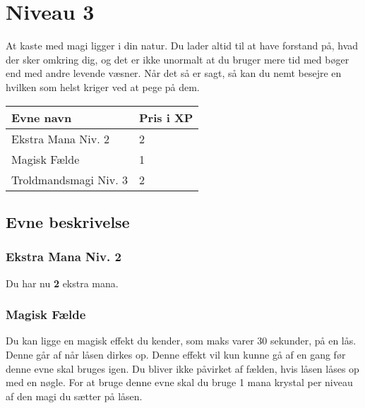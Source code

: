 \chapter*{Niveau 3}
At kaste med magi ligger i din natur. Du lader altid til at have forstand på, hvad der sker omkring dig, og det er ikke unormalt at du bruger mere tid med bøger end med andre levende væsner. Når det så er sagt, så kan du nemt besejre en hvilken som helst kriger ved at pege på dem.

\begin{table}[H]
    \centering
    \begin{tabular}{|p{}|p{}|}
    \rowcolor{cerulean!80}\hline
        Evne navn & Pris i XP \\\hline
        Ekstra Mana Niv. 2 & 2\\\hline
        Magisk Fælde & 1\\\hline 
        Troldmandsmagi Niv. 3 & 2\\\hline
    \end{tabular}
\end{table}
\section*{Evne beskrivelse}

\subsection*{Ekstra Mana Niv. 2} 
Du har nu \textbf{2} ekstra mana.


\subsection*{Magisk Fælde}
Du kan ligge en magisk effekt du kender, som maks varer 30 sekunder, på en lås. Denne går af når låsen dirkes op. Denne effekt vil kun kunne gå af en gang før denne evne skal bruges igen. Du bliver ikke påvirket af fælden, hvis låsen låses op med en nøgle. For at bruge denne evne skal du bruge 1 mana krystal per niveau af den magi du sætter på låsen.


